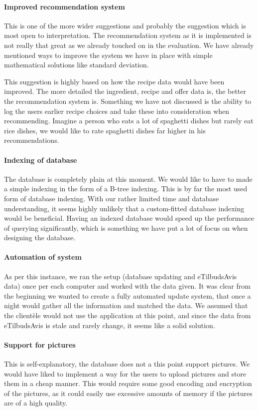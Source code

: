 \paragraph{Improved recommendation system}
This is one of the more wider suggestions and probably the suggestion which is most open to interpretation. The recommendation system as it is implemented is not really that great as we already touched on in the evaluation. We have already mentioned ways to improve the system we have in place with simple mathematical solutions like standard deviation.

This suggestion is highly based on how the recipe data would have been improved. The more detailed the ingredient, recipe and offer data is, the better the recommendation system is. Something we have not discussed is the ability to log the users earlier recipe choices and take these into consideration when recommending. Imagine a person who eats a lot of spaghetti dishes but rarely eat rice dishes, we would like to rate spaghetti dishes far higher in his recommendations.

\paragraph{Indexing of database}
The database is completely plain at this moment. We would like to have to made a simple indexing in the form of a B-tree indexing. This is by far the most used form of database indexing. With our rather limited time and database understanding, it seems highly unlikely that a custom-fitted database indexing would be beneficial. Having an indexed database would speed up the performance of querying significantly, which is something we have put a lot of focus on when designing the database.

\paragraph{Automation of system} 
As per this instance, we ran the setup (database updating and eTilbudsAvis data) once per each computer and worked with the data given. It was clear from the beginning we wanted to create a fully automated update system, that once a night would gather all the information and matched the data. We assumed that the clientèle would not use the application at this point, and since the data from eTilbudsAvis is stale and rarely change, it seems like a solid solution.

\paragraph{Support for pictures}
This is self-explanatory, the database does not a this point support pictures. We would have liked to implement a way for the users to upload pictures and store them in a cheap manner. This would require some good encoding and encryption of the pictures, as it could easily use excessive amounts of memory if the pictures are of a high quality.

